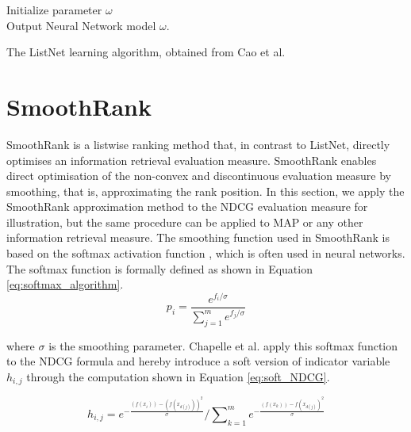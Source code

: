 \LinesNumbered
\begin{algorithm}[H]
 Initialize parameter $\omega$\\
 Output Neural Network model $\omega$.
 \caption{The ListNet learning algorithm, obtained from Cao et al. \cite{Cao2007}}
 \label{alg:listnet}
\end{algorithm}

\section{SmoothRank}
SmoothRank \cite{Chapelle2010} is a listwise ranking method that, in contrast to ListNet, directly optimises an information retrieval evaluation measure. SmoothRank enables direct optimisation of the non-convex and discontinuous evaluation measure by smoothing, that is, approximating the rank position. In this section, we apply the SmoothRank approximation method to the \ac{NDCG} evaluation measure for illustration, but the same procedure can be applied to \ac{MAP} or any other information retrieval measure. The smoothing function used in SmoothRank is based on the softmax activation function \cite{Bridle1990}, which is often used in neural networks. The softmax function is formally defined as shown in Equation \ref{eq:softmax_algorithm}.
\begin{equation}
p_i = \frac{e^{f_i/\sigma}}{\sum\nolimits_{j=1}^{m}e^{f_j/\sigma}}
\label{eq:softmax_algorithm}
\end{equation}

where $\sigma$ is the smoothing parameter. Chapelle et al. \cite{Chapelle2010} apply this softmax function to the \ac{NDCG} formula and hereby introduce a soft version of indicator variable $h_{i,j}$ through the computation shown in Equation \ref{eq:soft_NDCG}.

\begin{equation}
h_{i,j} = e^{-\frac{(f(x_i))-(f(x_{d(j)}))^2}{\sigma}}\Big/\sum\nolimits_{k=1}^{m}e^{-\frac{(f(x_k))-f(x_{d(j)})^2}{\sigma}}
\label{eq:soft_NDCG}
\end{equation}

